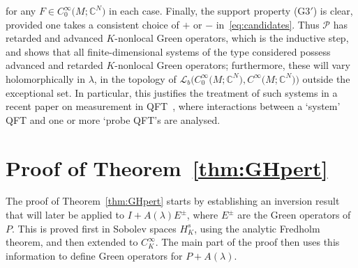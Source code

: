 \documentclass[pdftex]{sigma}
\numberwithin{equation}{section}
\newcommand{\CC}{{\mathbb C}}
\newcommand{\CoinX}[1]{C_0^\infty\big({#1}\big)}
\newcommand{\LL}{{\mathcal L}}
\newcommand{\Ps}{\mathcal{P}}
\begin{document}
 for any $F\in \CoinX{M;\CC^N}$ in each case.
 Finally, the support property (G3${}'$) is clear, provided one takes a consistent choice of $+$ or $-$ in~\eqref{eq:candidates}. Thus $\Ps$ has retarded and advanced $K$-nonlocal Green operators, which is the inductive step, and shows that all finite-dimensional systems of the type considered possess advanced and retarded $K$-nonlocal Green operators; furthermore, these will vary holomorphically in $\lambda$, in the topology of $\LL_b\big(\CoinX{M;\CC^N},C^\infty\big(M;\CC^N\big)\big)$ outside the exceptional set. In particular, this justifies the treatment of such systems in a recent paper on measurement in QFT~\cite{FewsterJubbRuep:2022}, where interactions between a `system' QFT and one or more `probe QFT's are analysed.



 \section{Proof of Theorem~\ref{thm:GHpert}}\label{sec:proof}

 The proof of Theorem~\ref{thm:GHpert} starts by establishing an inversion result that will later be applied to $I+A(\lambda)E^\pm$, where $E^\pm$ are the Green operators of $P$. This is proved first in Sobolev spaces $H^s_K$, using the analytic Fredholm theorem, and then extended to $C^\infty_K$. The main part of the proof then uses this information to define Green operators for $P+ A(\lambda)$.
\end{document}
